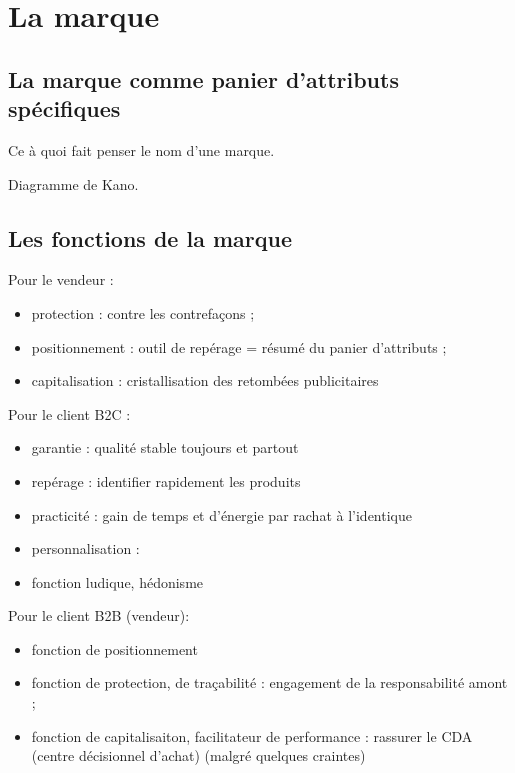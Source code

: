 
\chapter{La marque}
	
	\section{La marque comme panier d'attributs spécifiques}
		
	Ce à quoi fait penser le nom d'une marque.
	
	
	Diagramme de Kano.
	
	\section{Les fonctions de la marque}
	
	Pour le vendeur :
	
	\begin{itemize}
		\item protection : contre les contrefaçons ;
		\item positionnement  : outil de repérage = résumé du panier d'attributs ;
		\item capitalisation : cristallisation des retombées publicitaires
	\end{itemize}
	
	
	Pour le client B2C :
	
	\begin{itemize}
		\item garantie : qualité stable toujours et partout
		\item repérage : identifier rapidement les produits
		\item practicité : gain de temps et d'énergie par rachat à l'identique 
		\item personnalisation :
		\item fonction ludique, hédonisme
	\end{itemize}
	
	Pour le client B2B (vendeur):
	
	\begin{itemize}
		\item fonction de positionnement %
		\item fonction de protection, de traçabilité : engagement de la responsabilité amont ;
		\item fonction de capitalisaiton, facilitateur de performance : rassurer le CDA (centre décisionnel d'achat) (malgré quelques craintes)
	\end{itemize}
	
